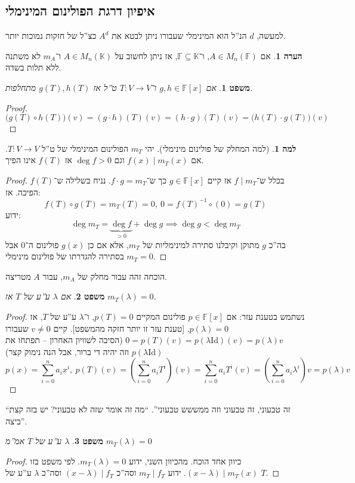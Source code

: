 \documentclass[]{article}
\newcommand\F         {\mathbb{F}}
\newcommand\K         {\mathbb{K}}
\newcommand\co        {\colon}
\renewcommand\lg      {\lambda}
\newcommand\op    {^{-1}}
\newcommand\cl [1]    {\left ( #1 \right )}
\newtheorem{Theorem}{משפט}
\theoremstyle{definition}
\newtheorem{Lemma}{למה}
\newtheorem{Remark}{הערה}
\newcommand\theo  [1] {\begin{Theorem}#1\end{Theorem}}
\newcommand\rmark [1] {\begin{Remark}#1\end{Remark}}
\newcommand\lem   [1] {\begin{Lemma}#1\end{Lemma}}
\begin{document}
    \subsection*{איפיון דרגת הפולינום המינימלי}
    למעשה, $d$ הנ''ל הוא המינימלי שעבורו ניתן לבטא את $A^{d}$ כצ''ל של חזקות נמוכות יותר. 
    \rmark{אם $A \in M_n(\F)$, ו־$\F \subseteq \K$, אז ניתן לחשוב על $A \in M_n(\K)$ ו־$m_A$ לא משתנה ללא תלות בשדה. }
    \theo{אם $g, h \in \F[x]$ ו־$T \co V \to V$ ט''ל אז $g(T), h(T)$ מתחלפות. }
    \begin{proof}
        \[ \big(g(T) \circ h(T)\big)(v) = (g \cdot h)(T)(v) = (h \cdot g)(T)(v) = \big(h(T) \cdot g(T) \big)(v) \]
    \end{proof}
    
    \lem{(למה המחלק של פולינום מינימלי). יהי $m_T$ הפולינום המינימלי של ט''ל $T \co V \to V$. אם $f(x) \mid m_T(x)$ וגם $\deg f > 0$ אז $f(T)$ אינו הפיך. }
    \begin{proof}
        בכלל ש־$f \mid m_T$ אז קיים $g\in \F[x]$ כך ש־$f \cdot g = m_T$. נניח בשלילה ש־$f(T)$ הפיכה. אז: 
        \[ f(T) \circ g(T) = m_T(T) = 0, \ 0 = f(T)\op \circ (0) = g(T) \]
        ידוע: 
        \[ \deg m_T = \underbrace{\deg f}_{>0} + \deg g \implies \deg g< \deg m_T \]
        בה''כ $g$ מתוקן וקיבלנו סתירה למינימליות של $m_T$, אלא אם כן $g(x)$ פולינום ה־$0$ אבל $m_T = 0$ בסתירה להגדרתו של פולינום מינימלי. 
    \end{proof}
    הוכחה זהה עבור מחלק של $m_A$, עבור $A$ מטריצה. 
    \theo{אם $\lg$ ע''ע של $T$ אז $m_T(\lg) = 0$. }\begin{proof}
        נשתמש בטענת עזר: אם $p \in \F[x]$ פולינום המקיים $p(T) = 0$, ו־$\lg$ ע''ע של $T$, אז $p(\lg) = 0$. [טענת עזר זו יותר חזקה מהמשפט]. קיים $v \neq 0$ שעבורו $0 = p(T)(v) = p(\lg \mathrm{Id})(v) = p(\lg)v$ (הסיבה לשוויון האחרון – תפתחו את $p(\lg \mathrm{Id})$ וזה יהיה די ברור, אבל הנה נימוק קצר)
        \[ p(x) = \sum_{i = 0}^{n}a_ix^i, \ p(T)(v) = \cl{\sum_{i = 0}^{n}a_iT^{i}}\cl{v} = \sum_{i = 0}^{n}a_iT^{i}(v) = \cl{\sum_{i = 0}^{n}a_i\lg^i}v = p(\lg)v \] 
    \end{proof}
    ``זה טבעוני, זה טבעוני וזה ממששש טבעוני''. ``מה זה אומר שזה לא טבעוני? יש בזה קצת ביצה''. 
    \theo{$\lg$ ע''ע של $T$ אמ''מ $m_T(\lg) = 0$} \begin{proof}
        כיוון אחד הוכח. מהכיוון השני, ידוע $m_T(\lg) = 0$. לפי משפט בזו $(x - \lg) \mid m_T(x)$. ידוע $m_T \mid f_T$ וסה''כ $(x - \lg) \mid f_T$ וסה''כ $\lg$ ע''ע של $T$. 
    \end{proof}
    
\end{document}
